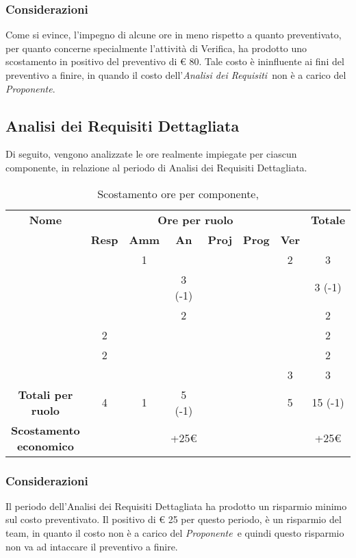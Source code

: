 \subsubsection{Considerazioni}
Come si evince, l'impegno di alcune ore in meno rispetto a quanto preventivato, per quanto concerne specialmente l'attività di Verifica, ha prodotto uno scostamento in positivo del preventivo di € 80. Tale costo è ininfluente ai fini del preventivo a finire, in quando il costo dell'\textit{Analisi dei Requisiti}\ non è a carico del \textit{Proponente}.


\newpage
\subsection{Analisi dei Requisiti Dettagliata}

Di seguito, vengono analizzate le ore realmente impiegate per ciascun componente, in relazione al periodo di Analisi dei Requisiti Dettagliata.

\begin{table}[H]
	\begin{center}
		\begin{tabular}{|c|c|c|c|c|c|c|c|}
			\hline
			\textbf{Nome} & \multicolumn{6}{c|}{\textbf{Ore per ruolo}} & \textbf{Totale} \\\cline{2-7}
			& \textbf{Resp} & \textbf{Amm} & \textbf{An} & \textbf{Proj} & \textbf{Prog} & \textbf{Ver} & \\
			\hline
			\MC			&		&	1	&	 	&		&		&	2 	&	 3	\\
			\hline
			\AN			&		&		&	3 (-1) 	&	 	&		&	 	& 	 3 (-1)	\\
			\hline
			\DAN		&		&	 	&	2 	&		&		&		&	 2	\\
			\hline
			\AS			&	2	&	 	&	  	&		&	 	& 		&	 2	\\
			\hline
			\NS 		&	2	&		&	 	&		&		& 		&	 2	\\
			\hline
			\DS			& 		&	 	&	 	&		&		&	3 	&	 3	\\
			\hline
			\textbf{Totali per ruolo}	& 	4	&	1	&	5 (-1)	&		&		&	5	&	15 (-1)	\\
			\hline
			\textbf{Scostamento economico}	& 		&		&	+25€	&		&		&	&	+25€	\\
			\hline
		\end{tabular}
	\end{center}
	\caption{Scostamento ore per componente, \ARD}
\end{table}

\subsubsection{Considerazioni}
Il periodo dell'Analisi dei Requisiti Dettagliata ha prodotto un risparmio minimo sul costo preventivato. Il positivo di € 25 per questo periodo, è un risparmio del team, in quanto il costo non è a carico del \textit{Proponente}\ e quindi questo risparmio non va ad intaccare il preventivo a finire.

